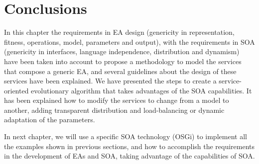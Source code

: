 \section{Conclusions}
In this chapter the requirements in EA design (genericity in representation, fitness, operations, model, parameters and output), with the requirements in SOA (genericity in interfaces, language independence, distribution and dynamism) have been taken into account to propose a methodology to model the services that compose a generic EA, and several guidelines about the design of these services have been explained. We have presented the steps to create a service-oriented evolutionary algorithm that takes advantages of the SOA capabilities. It has been explained how to modify the services to change from a model to another, adding transparent distribution and load-balancing or dynamic adaptation of the parameters.

In next chapter, we will use a specific SOA technology (OSGi) to implement all the examples shown in previous sections, and how to accomplish the requirements in the development of EAs and SOA, taking advantage of the capabilities of SOA.


